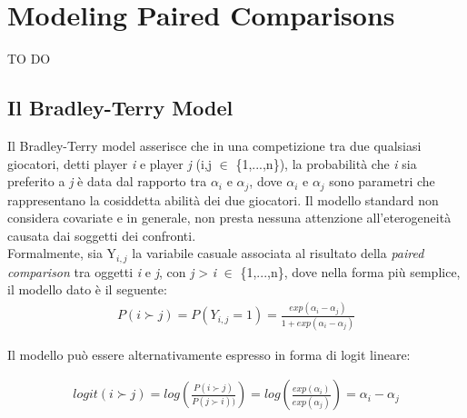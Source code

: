 \chapter{Modeling Paired Comparisons}

TO DO

\section{Il Bradley-Terry Model}
Il Bradley-Terry model \autocite{bradley1952rank} asserisce che in una competizione tra due qualsiasi giocatori, detti player \textit{i} e player \textit{j} (i,j $\in$ \{1,...,n\}), la probabilità che \textit{i} sia preferito a \textit{j} è data dal rapporto tra $\alpha_{i}$ e $\alpha_{j}$, dove $\alpha_{i}$ e $\alpha_{j}$ sono parametri che rappresentano la cosiddetta abilità dei due giocatori. Il modello standard non considera covariate e in generale, non presta nessuna attenzione all'eterogeneità causata dai soggetti dei confronti.\\

Formalmente, sia Y$_{i,j}$ la variabile casuale associata al risultato della \emph{paired comparison} tra oggetti \textit{i} e \textit{j}, con \textit{j} > \textit{i} $\in$ \{1,...,n\}, dove nella forma più semplice, il modello dato è il seguente:
\begin{align} 
	P(i\succ j) = P(Y_{i,j} = 1) = \frac{exp(\alpha_{i} - \alpha_{j})}{1 + exp(\alpha_{i} - \alpha_{j})} \label{for:3.1} 
\end{align}

Il modello può essere alternativamente espresso in forma di logit lineare:

\begin{align}
		logit(i \succ j) =  log( \frac{P( i \succ j)}{P( j \succ i))} ) = log(\frac{exp(\alpha_{i})}{exp(\alpha_{j})}) = \alpha_i - \alpha_j 
	\end{align}

